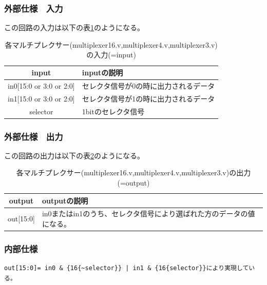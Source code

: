 \documentclass[a4j,titlepage]{jarticle}
\begin{document}
\subsubsection{外部仕様　入力}
この回路の入力は以下の表\ref{eachmultiplexerI}のようになる。
\begin{table}[H]
    \caption{各マルチプレクサー(multiplexer16.v,multiplexer4.v,multiplexer3.v)の入力(=input)}
    \label{eachmultiplexerI}
    \begin{center}
    \begin {tabularx}{150mm}{|c|X|} \hline
         input & inputの説明 \\ \hline \hline
         in0[15:0 or 3:0 or 2:0] & セレクタ信号が0の時に出力されるデータ\\ \hline
         in1[15:0 or 3:0 or 2:0] & セレクタ信号が1の時に出力されるデータ\\ \hline %
         selector & 1bitのセレクタ信号\\ \hline
    \end{tabularx}
    \end{center}
\end{table}

\subsubsection{外部仕様　出力}
この回路の出力は以下の表\ref{eachmultiplexerO}のようになる。
\begin{table}[H]
    \caption{各マルチプレクサー(multiplexer16.v,multiplexer4.v,multiplexer3.v)の出力(=output)}
    \label{eachmultiplexerO}
    \begin{center}
    \begin {tabularx}{150mm}{|c|X|} \hline
         output & outputの説明 \\ \hline \hline
         out[15:0] & in0またはin1のうち、セレクタ信号により選ばれた方のデータの値になる。\\ \hline
    \end {tabularx}
    \end{center}
\end{table}

\subsubsection{内部仕様}
\begin{verbatim}
out[15:0]= in0 & {16{~selector}} | in1 & {16{selector}}により実現している。
\end{verbatim}
\end{document}
